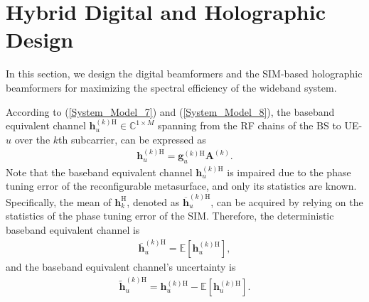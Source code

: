 \documentclass[lettersize,journal]{IEEEtran}
\theoremstyle{remark}
\begin{document}
\section{Hybrid Digital and Holographic Design}\label{Beamforming_Design}
In this section, we design the digital beamformers and the SIM-based holographic beamformers for maximizing the spectral efficiency of the wideband system.

According to (\ref{System_Model_7}) and (\ref{System_Model_8}), the baseband equivalent channel $\mathbf{h}_u^{(k)\mathrm{H}}\in\mathbb{C}^{1\times M}$ spanning from the RF chains of the BS to UE-$u$ over the $k$th subcarrier, can be expressed as
\begin{align}\label{Beamforming_Design_1}
    \mathbf{h}_u^{(k)\mathrm{H}}=\mathbf{g}_u^{(k)\mathrm{H}}\mathbf{A}^{(k)}.
\end{align}
Note that the baseband equivalent channel $\mathbf{h}_u^{(k)\mathrm{H}}$ is impaired due to the phase tuning error of the reconfigurable metasurface, and only its statistics are known. Specifically, the mean of $\mathbf{h}_k^{\mathrm{H}}$, denoted as $\overline{\mathbf{h}}_u^{(k)\mathrm{H}}$, can be acquired by relying on the statistics of the phase tuning error of the SIM. Therefore, the deterministic baseband equivalent channel is
\begin{align}\label{Beamforming_Design_2}
    \overline{\mathbf{h}}_u^{(k)\mathrm{H}}=\mathbb{E}\left[\mathbf{h}_u^{(k)\mathrm{H}}\right],
\end{align}
and the baseband equivalent channel's uncertainty is
\begin{align}\label{Beamforming_Design_3}
    \widetilde{\mathbf{h}}_u^{(k)\mathrm{H}}=\mathbf{h}_u^{(k)\mathrm{H}}-
    \mathbb{E}\left[\mathbf{h}_u^{(k)\mathrm{H}}\right].
\end{align}
\end{document}
